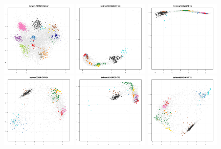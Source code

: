 \documentclass[12pt]{article}\usepackage[]{graphicx}\usepackage[]{color}
\begin{document}
\begin{appendices}
\begin{figure}[htb]
  \includegraphics[width = 0.32\textwidth]{./figure/figpca-6.pdf}
  \includegraphics[width = 0.32\textwidth]{./figure/figpca-7.pdf}
  \includegraphics[width = 0.32\textwidth]{./figure/figpca-8.pdf}
  \includegraphics[width = 0.32\textwidth]{./figure/figpca-9.pdf}
  \includegraphics[width = 0.32\textwidth]{./figure/figpca-10.pdf}
  \includegraphics[width = 0.32\textwidth]{./figure/figpca-11.pdf}

\end{figure}
\end{appendices}
\end{document}
